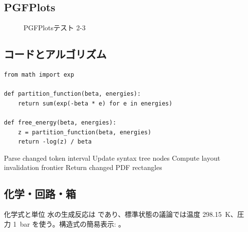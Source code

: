 \documentclass[12pt,a4paper,openany]{ltjsbook}
\theoremstyle{definition}
\theoremstyle{plain}
\theoremstyle{remark}
\begin{document}
\subsection{PGFPlots}
\begin{figure}[H]
\centering
{}
\caption{PGFPlotsテスト 2-3}\label{fig:pgfplots-2-3}
\end{figure}

\subsection{コードとアルゴリズム}
\begin{lstlisting}[style=pythonstyle,caption={Python風擬似コード 2-3}]
from math import exp

def partition_function(beta, energies):
    return sum(exp(-beta * e) for e in energies)

def free_energy(beta, energies):
    z = partition_function(beta, energies)
    return -log(z) / beta
\end{lstlisting}

\begin{algorithm}[H]
\caption{差分プレビュー更新アルゴリズム 2-3}
Parse changed token interval\;
Update syntax tree nodes\;
Compute layout invalidation frontier\;
Return changed PDF rectangles\;
\end{algorithm}

\subsection{化学・回路・箱}
\begin{greenbox}{化学式と単位}
水の生成反応は  であり、標準状態の議論では温度 \SI{298.15}{\kelvin}、圧力 \SI{1}{\bar} を使う。構造式の簡易表示: 。
\end{greenbox}
\end{document}

